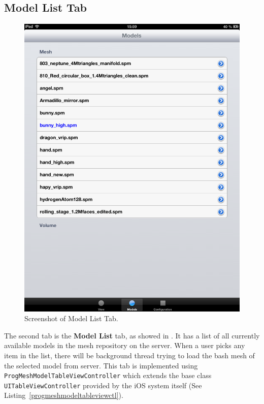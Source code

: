 \subsection{Model List Tab}
\label{section:modellist}
\begin{figure}
	\centering
	\includegraphics[width=1.0\textwidth]{images/ModelList.png}
	\caption{Screenshot of Model List Tab.}
	\label{fig:modellisttab}
\end{figure}


The second tab is the \textbf{Model List} tab, as showed in . It has a list of all currently available models in the mesh repository on the server. When a user picks any item in the list, there will be background thread trying to load the bash mesh of the selected model from server. This tab is implemented using \texttt{ProgMeshModelTableViewController} which extends the base class \texttt{UITableViewController} provided by the iOS system itself (See Listing~\ref{progmeshmodeltableviewctl}). 


